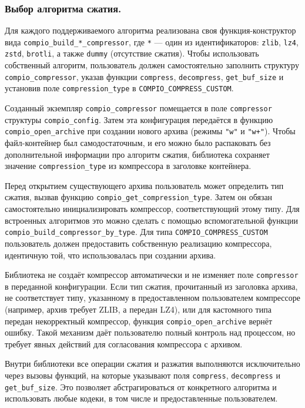 \subsubsection{Выбор алгоритма сжатия.} \label{compression_algorithm}
Для каждого поддерживаемого алгоритма реализована своя функция-конструктор вида \texttt{compio\_build\_*\_compressor}, где \texttt{*} — один из идентификаторов: \texttt{zlib}, \texttt{lz4}, \texttt{zstd}, \texttt{brotli}, а также \texttt{dummy} (отсутствие сжатия).
Чтобы использовать собственный алгоритм, пользователь должен самостоятельно заполнить структуру \texttt{compio\_compressor}, указав функции \texttt{compress}, \texttt{decompress}, \texttt{get\_buf\_size} и установив поле \texttt{compression\_type} в \texttt{COMPIO\_COMPRESS\_CUSTOM}.

Созданный экземпляр \texttt{compio\_compressor} помещается в поле \texttt{compressor} структуры \texttt{compio\_config}. Затем эта конфигурация передаётся в функцию \texttt{compio\_open\_archive} при создании нового архива (режимы \texttt{"w"} и \texttt{"w+"}). Чтобы файл-контейнер был самодостаточным, и его можно было распаковать без дополнительной информации про алгоритм сжатия, библиотека сохраняет значение \texttt{compression\_type} из компрессора в заголовке контейнера.

Перед открытием существующего архива пользователь может определить тип сжатия, вызвав функцию \texttt{compio\_get\_compression\_type}. Затем он обязан самостоятельно инициализировать компрессор, соответствующий этому типу. Для встроенных алгоритмов это можно сделать с помощью вспомогательной функции \texttt{compio\_build\_compressor\_by\_type}. Для типа \texttt{COMPIO\_COMPRESS\_CUSTOM} пользователь должен предоставить собственную реализацию компрессора, идентичную той, что использовалась при создании архива. 

Библиотека не создаёт компрессор автоматически и не изменяет поле \texttt{compressor} в переданной конфигурации. Если тип сжатия, прочитанный из заголовка архива, не соответствует типу, указанному в предоставленном пользователем компрессоре (например, архив требует ZLIB, а передан LZ4), или для кастомного типа передан некорректный компрессор, функция \texttt{compio\_open\_archive} вернёт ошибку. Такой механизм даёт пользователю полный контроль над процессом, но требует явных действий для согласования компрессора с архивом.

Внутри библиотеки все операции сжатия и разжатия выполняются исключительно через вызовы функций, на которые указывают поля \texttt{compress}, \texttt{decompress} и \texttt{get\_buf\_size}. Это позволяет абстрагироваться от конкретного алгоритма и использовать любые кодеки, в том числе и предоставленные пользователем.

